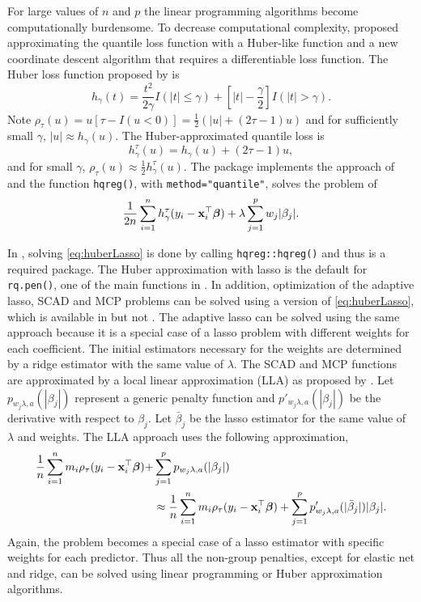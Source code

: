 For large values of \(n\) and \(p\) the linear programming algorithms become computationally burdensome. To decrease computational complexity, \citet{huber_cd} proposed approximating the quantile loss function with a Huber-like function and a new coordinate descent algorithm that requires a differentiable loss function. The Huber loss function proposed by \citet{huber1964} is
\[
h_\gamma(t) = \frac{t^2}{2\gamma}I(|t| \leq \gamma)+\left[|t|-\frac{\gamma}{2}\right]I(|t|>\gamma).
\]
Note \(\rho_\tau(u) = u[\tau-I(u<0)]=\frac{1}{2}(|u|+(2\tau-1)u)\) and for sufficiently small \(\gamma\), \(|u| \approx h_\gamma(u)\). The Huber-approximated quantile loss is
\begin{equation}
h_{\gamma}^{\tau}(u) = h_\gamma(u) + (2\tau-1)u,
\label{eq:huberQuantile}
\end{equation}
and for small \(\gamma\), \(\rho_\tau(u) \approx \frac{1}{2}h_{\gamma}^{\tau}(u)\). The package  implements the approach of \citet{huber_cd} and the function \texttt{hqreg()}, with \texttt{method="quantile"}, solves the problem of
\begin{equation}
\frac{1}{2n} \sum_{i=1}^n h_{\gamma}^{\tau}(y_i - {\bf x}_i^\top\boldsymbol \beta) +  \lambda \sum_{j=1}^p w_j|\beta_j|.
\label{eq:huberLasso}
\end{equation}

In , solving \eqref{eq:huberLasso} is done by calling \texttt{hqreg::hqreg()} and thus  is a required package. The Huber approximation with lasso is the default for \texttt{rq.pen()}, one of the main functions in . In addition, optimization of the adaptive lasso, SCAD and MCP problems can be solved using a version of \eqref{eq:huberLasso}, which is available in  but not . The adaptive lasso can be solved using the same approach because it is a special case of a lasso problem with different weights for each coefficient. The initial estimators necessary for the weights are determined by a ridge estimator with the same value of \(\lambda\). The SCAD and MCP functions are approximated by a local linear approximation (LLA) as proposed by \citet{lla}. Let \(p_{w_j\lambda,a}(|\beta_j|)\) represent a generic penalty function and \(p'_{w_j\lambda,a}(|\beta_j|)\) be the derivative with respect to \(\beta_j\). Let \(\bar{\beta}_j\) be the lasso estimator for the same value of \(\lambda\) and weights. The LLA approach uses the following approximation,
\begin{align}
\frac{1}{n} \sum_{i=1}^n m_i \rho_\tau(y_i-{\bf x}_i^\top\boldsymbol \beta)  + & \sum_{j=1}^p p_{w_j\lambda,a}(|\beta_j|) \nonumber \\
 & \approx \frac{1}{n} \sum_{i=1}^n m_i \rho_\tau(y_i-{\bf x}_i^\top\boldsymbol \beta) + \sum_{j=1}^p p'_{w_j\lambda,a}(|\bar{\beta}_j|)|\beta_j|.
\label{eq:lla}
\end{align}
Again, the problem becomes a special case of a lasso estimator with specific weights for each predictor. Thus all the non-group penalties, except for elastic net and ridge, can be solved using linear programming or Huber approximation algorithms.

